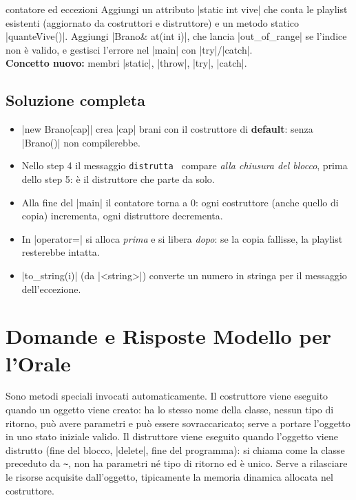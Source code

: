 \begin{step}{contatore ed eccezioni}
Aggiungi un attributo \cc|static int vive| che conta le playlist esistenti
(aggiornato da costruttori e distruttore) e un metodo statico \cc|quanteVive()|.
Aggiungi \cc|Brano& at(int i)|, che lancia \cc|out_of_range| se l'indice non è
valido, e gestisci l'errore nel \cc|main| con \cc|try|/\cc|catch|.\\[0.3em]
\textbf{Concetto nuovo:} membri \cc|static|, \cc|throw|, \cc|try|, \cc|catch|.
\end{step}

\subsection*{Soluzione completa}

\begin{consiglio}
\begin{itemize}
  \item \cc|new Brano[cap]| crea \cc|cap| brani con il costruttore di
        \textbf{default}: senza \cc|Brano()| non compilerebbe.
  \item Nello step 4 il messaggio \texttt{distrutta } compare
        \emph{alla chiusura del blocco}, prima dello step 5: è il distruttore che
        parte da solo.
  \item Alla fine del \cc|main| il contatore torna a 0: ogni costruttore (anche
        quello di copia) incrementa, ogni distruttore decrementa.
  \item In \cc|operator=| si alloca \emph{prima} e si libera \emph{dopo}: se la
        copia fallisse, la playlist resterebbe intatta.
  \item \cc|to_string(i)| (da \cc|<string>|) converte un numero in stringa per il
        messaggio dell'eccezione.
\end{itemize}
\end{consiglio}

\section{Domande e Risposte Modello per l'Orale}

\begin{orale}
Sono metodi speciali invocati automaticamente. Il costruttore viene eseguito
quando un oggetto viene creato: ha lo stesso nome della classe, nessun tipo di
ritorno, può avere parametri e può essere sovraccaricato; serve a portare
l'oggetto in uno stato iniziale valido. Il distruttore viene eseguito quando
l'oggetto viene distrutto (fine del blocco, \cc|delete|, fine del programma): si
chiama come la classe preceduto da \texttt{\textasciitilde}, non ha parametri né
tipo di ritorno ed è unico. Serve a rilasciare le risorse acquisite dall'oggetto,
tipicamente la memoria dinamica allocata nel costruttore.
\end{orale}

